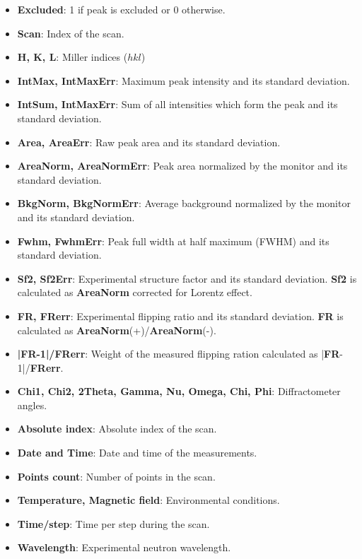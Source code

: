 \begin{itemize}
	\item \textbf{Excluded}: 1 if peak is excluded or 0 otherwise.
	\item \textbf{Scan}: Index of the scan.
	\item \textbf{H, K, L}: Miller indices ($hkl$)
	\item \textbf{IntMax, IntMaxErr}: Maximum peak intensity and its standard deviation.
	\item \textbf{IntSum, IntMaxErr}: Sum of all intensities which form the peak and its standard deviation.
	\item \textbf{Area, AreaErr}: Raw peak area and its standard deviation.
	\item \textbf{AreaNorm, AreaNormErr}: Peak area normalized by the monitor and its standard deviation.
	\item \textbf{BkgNorm, BkgNormErr}: Average background normalized by the monitor and its standard deviation.
	\item \textbf{Fwhm, FwhmErr}: Peak full width at half maximum (FWHM) and its standard deviation.
	\item \textbf{Sf2, Sf2Err}: Experimental structure factor and its standard deviation. \textbf{Sf2} is calculated as \textbf{AreaNorm} corrected for Lorentz effect.
	\item \textbf{FR, FRerr}: Experimental flipping ratio and its standard deviation. \textbf{FR} is calculated as \textbf{AreaNorm}(+)/\textbf{AreaNorm}(-).
	\item \textbf{|FR-1|/FRerr}: Weight of the measured flipping ration calculated as |\textbf{FR}-1|/\textbf{FRerr}.
	\item \textbf{Chi1, Chi2, 2Theta, Gamma, Nu, Omega, Chi, Phi}: Diffractometer angles.
	\item \textbf{Absolute index}: Absolute index of the scan.
	\item \textbf{Date and Time}: Date and time of the measurements.
	\item \textbf{Points count}: Number of points in the scan.
	\item \textbf{Temperature, Magnetic field}: Environmental conditions.
	\item \textbf{Time/step}: Time per step during the scan.
	\item \textbf{Wavelength}: Experimental neutron wavelength.
\end{itemize}

\newpage
